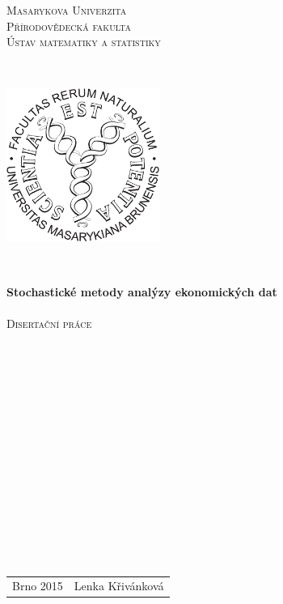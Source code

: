\documentclass[a4paper,12pt]{report}
\theoremstyle{definition} \newtheorem{definice}[veta]{Definice}
\theoremstyle{remark}
\begin{document}
\titlepage
\begin{center}
\textsc{\Large{Masarykova Univerzita}} \\
\textsc{\Large{Přírodovědecká fakulta}} \\
\textsc{\large{Ústav matematiky a statistiky}}
\end{center}\quad \\
%
\begin{center}
\includegraphics[width=5cm]{IMG/sci-logo.pdf}
\end{center}\quad \\
%
\begin{center}
\textbf{\Large{Stochastické metody analýzy ekonomických dat}} \\ \quad \\
\textsc{\large{Disertační práce}}
\end{center} \quad \\\\\\\\\\\\\\\\\\\\\\\\\\ \\
\begin{center}
\large{
\begin{tabular}{l  r}
\Large{Brno 2015} \qquad\qquad\qquad\qquad \qquad\qquad & \Large{Lenka Křivánková}
\end{tabular}
}
\end{center} \quad
%
\end{document}
